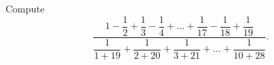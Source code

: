 Compute
\[
\dfrac{1-\dfrac{1}{2}+\dfrac{1}{3}-\dfrac{1}{4}+\dots+\dfrac{1}{17}-\dfrac{1}{18}+\dfrac{1}{19}}{\dfrac{1}{1+19}+\dfrac{1}{2+20}+\dfrac{1}{3+21}+\dots+\dfrac{1}{10+28}}.
\]
